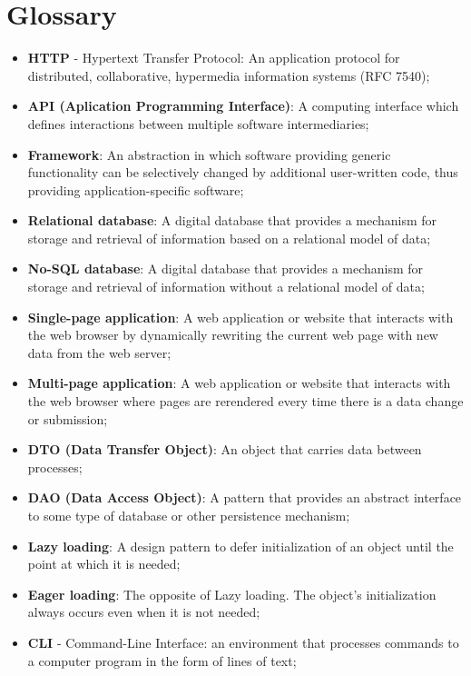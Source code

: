 \chapter*{Glossary}

\begin{itemize}
    \item \textbf{HTTP} - Hypertext Transfer Protocol: An application protocol for distributed,
     collaborative, hypermedia information systems (RFC 7540);
    \item \textbf{API (Aplication Programming Interface)}: A computing interface which defines
     interactions between multiple software intermediaries;
    \item \textbf{Framework}: An abstraction in which software providing generic functionality can
     be selectively changed by additional user-written code,
     thus providing application-specific software;
     \item \textbf{Relational database}: A digital database that provides a mechanism for storage and
     retrieval of information based on a relational model of data;
     \item \textbf{No-SQL database}: A digital database that provides a mechanism for storage and
     retrieval of information without a relational model of data;
     \item \textbf{Single-page application}: A web application or website that interacts with the web browser by dynamically
     rewriting the current web page with new data from the web server;
     \item \textbf{Multi-page application}: A web application or website that interacts with the web browser where pages
     are rerendered every time there is a data change or submission;
     \item \textbf{DTO (Data Transfer Object)}: An object that carries data between processes;
     \item \textbf{DAO (Data Access Object)}: A pattern that provides an abstract interface to  
     some type of database or other persistence mechanism;
     \item \textbf{Lazy loading}: A design pattern to defer initialization of an object until the point at which it is needed;
     \item \textbf{Eager loading}: The opposite of Lazy loading. The object's initialization always occurs even when it is not needed;
     \item \textbf{CLI} - Command-Line Interface: an environment that processes commands to a computer program in the form of lines of text;
\end{itemize}